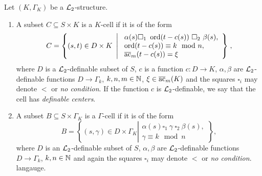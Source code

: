 \begin{defn}[Cells] Let $(K,\Gamma_K)$ be a ${\mathcal L}_2$-structure.  
\begin{enumerate}
\item A subset $C\subseteq S\times K$ is a $K$-cell if it is of the form 
\[C = \left\{(s,t) \in D\times K \ \left| \ \begin{array}{l} \alpha(s) \square_1 \ \operatorname{ord}(t-c(s)) \ \square_2 \ \beta(s),\\ \operatorname{ord}(t-c(s)) \equiv k\mod n,\\ {\overline{\rm ac}}_{m}(t-c(s)) = \xi \end{array} \right\}\right.,\]
where $D$ is a ${\mathcal L}_2$-definable subset of $S$, $c$ is a function $c:D\to K$, $\alpha, \beta$ are $\mathcal{L}_2$-definable functions $D\to\Gamma_k$, $k, n, m \in {\mathbb N}$, $\xi \in {\overline{\rm ac}}_{m}(K)$ and the squares $\square_i$ may denote $<$ or \emph{no condition}. If the function $c$ is ${\mathcal L}_2$-definable, we say that the cell has \emph{definable centers}.  
\item A subset $B\subseteq S\times \Gamma_K$ is a $\Gamma$-cell if it is of the form
\[B= \left\{(s,\gamma)\in D\times \Gamma_K \left|\begin{array}{l} \alpha(s) \square_1 \ \gamma \ \square_2 \ \beta(s), \\
\gamma \equiv k\mod n \end{array}\right\}\right.,\]
where $D$ is an ${\mathcal L}_2$-definable subset of $S$, $\alpha, \beta$ are $\mathcal{L}_2$-definable functions $D\to\Gamma_k$, $k, n\in {\mathbb N}$ and again the squares $\square_i$ may denote $<$ or \emph{no condition}.  
 langauge. 
\end{enumerate}
\end{defn}

